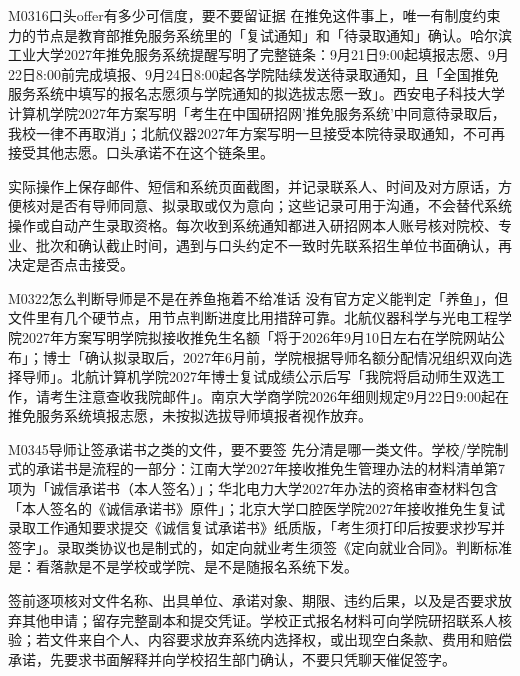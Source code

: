 \begin{qa}{M0316}{口头offer有多少可信度，要不要留证据}
在推免这件事上，唯一有制度约束力的节点是教育部推免服务系统里的「复试通知」和「待录取通知」确认。哈尔滨工业大学2027年推免服务系统提醒写明了完整链条：9月21日9:00起填报志愿、9月22日8:00前完成填报、9月24日8:00起各学院陆续发送待录取通知，且「全国推免服务系统中填写的报名志愿须与学院通知的拟选拔志愿一致」。西安电子科技大学计算机学院2027年方案写明「考生在中国研招网'推免服务系统'中同意待录取后，我校一律不再取消」；北航仪器2027年方案写明一旦接受本院待录取通知，不可再接受其他志愿。口头承诺不在这个链条里。

实际操作上保存邮件、短信和系统页面截图，并记录联系人、时间及对方原话，方便核对是否有导师同意、拟录取或仅为意向；这些记录可用于沟通，不会替代系统操作或自动产生录取资格。每次收到系统通知都进入研招网本人账号核对院校、专业、批次和确认截止时间，遇到与口头约定不一致时先联系招生单位书面确认，再决定是否点击接受。
\end{qa}

\begin{qa}{M0322}{怎么判断导师是不是在养鱼拖着不给准话}
没有官方定义能判定「养鱼」，但文件里有几个硬节点，用节点判断进度比用措辞可靠。北航仪器科学与光电工程学院2027年方案写明学院拟接收推免生名额「将于2026年9月10日左右在学院网站公布」；博士「确认拟录取后，2027年6月前，学院根据导师名额分配情况组织双向选择导师」。北航计算机学院2027年博士复试成绩公示后写「我院将启动师生双选工作，请考生注意查收我院邮件」。南京大学商学院2026年细则规定9月22日9:00起在推免服务系统填报志愿，未按拟选拔导师填报者视作放弃。
\end{qa}

\begin{qa}{M0345}{导师让签承诺书之类的文件，要不要签}
先分清是哪一类文件。学校/学院制式的承诺书是流程的一部分：江南大学2027年接收推免生管理办法的材料清单第7项为「诚信承诺书（本人签名）」；华北电力大学2027年办法的资格审查材料包含「本人签名的《诚信承诺书》原件」；北京大学口腔医学院2027年接收推免生复试录取工作通知要求提交《诚信复试承诺书》纸质版，「考生须打印后按要求抄写并签字」。录取类协议也是制式的，如定向就业考生须签《定向就业合同》。判断标准是：看落款是不是学校或学院、是不是随报名系统下发。

签前逐项核对文件名称、出具单位、承诺对象、期限、违约后果，以及是否要求放弃其他申请；留存完整副本和提交凭证。学校正式报名材料可向学院研招联系人核验；若文件来自个人、内容要求放弃系统内选择权，或出现空白条款、费用和赔偿承诺，先要求书面解释并向学校招生部门确认，不要只凭聊天催促签字。
\end{qa}

